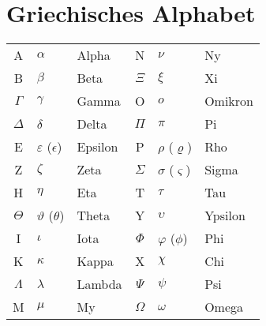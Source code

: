 \section{Griechisches Alphabet}

\begin{table}[h!]
\begin{tabular}{c p{} p{} c p{} l}
A & $\alpha$ & Alpha 			& N & $\nu$ & Ny \\
B & $\beta$ & Beta 			& $\Xi$ & $\xi$ & Xi \\
$\Gamma$ & $\gamma$ & Gamma 		& O & $o$ & Omikron \\
$\Delta$ & $\delta$ & Delta 		& $\Pi$ & $\pi$ & Pi \\
E & $\varepsilon$ ($\epsilon$) & Epsilon & P & $\rho$ ($\varrho$) & Rho \\
Z & $\zeta$ & Zeta 			& $\Sigma$ & $\sigma$ ($\varsigma$) & Sigma \\
H & $\eta$ & Eta 			& T & $\tau$ & Tau \\
$\Theta$ & $\vartheta$ ($\theta$) & Theta & Y & $\upsilon$ & Ypsilon \\
I & $\iota$ & Iota 			& $\Phi$ & $\varphi$ ($\phi$) & Phi \\
K & $\kappa$ & Kappa 			& X & $\chi$ & Chi \\
$\Lambda$ & $\lambda$ & Lambda 		& $\Psi$ & $\psi$ & Psi \\
M & $\mu$ & My 				& $\Omega$ & $\omega$ & Omega \\
\end{tabular}
\end{table}
